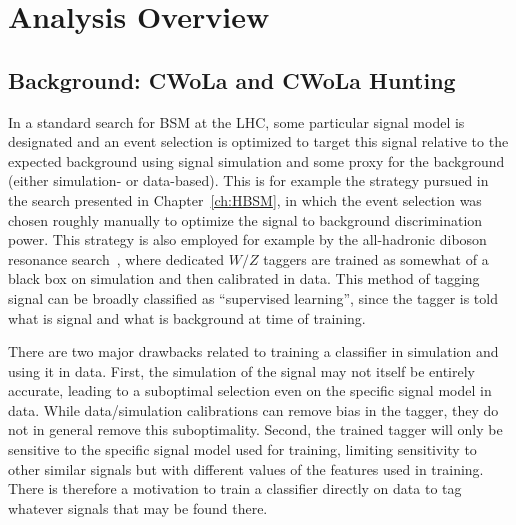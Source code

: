 \section{Analysis Overview}
\label{sec:CWoLa:analysis}

\subsection{Background: CWoLa and CWoLa Hunting}
\label{sec:CWoLa:schematic}
In a standard search for BSM at the LHC, some particular signal model is designated and an event selection is optimized to target this signal relative to the expected background using signal simulation and some proxy for the background (either simulation- or data-based).
This is for example the strategy pursued in the search presented in Chapter~\ref{ch:HBSM}, in which the event selection was chosen roughly manually to optimize the signal to background discrimination power.
This strategy is also employed for example by the all-hadronic diboson resonance search~\cite{Aad:2019fbh}, where dedicated $W/Z$ taggers are trained as somewhat of a black box on simulation and then calibrated in data.
This method of tagging signal can be broadly classified as ``supervised learning'', since the tagger is told what is signal and what is background at time of training.

There are two major drawbacks related to training a classifier in simulation and using it in data.
First, the simulation of the signal may not itself be entirely accurate, leading to a suboptimal selection even on the specific signal model in data.
While data/simulation calibrations can remove bias in the tagger, they do not in general remove this suboptimality.
Second, the trained tagger will only be sensitive to the specific signal model used for training, limiting sensitivity to other similar signals but with different values of the features used in training.
There is therefore a motivation to train a classifier directly on data to tag whatever signals that may be found there.

